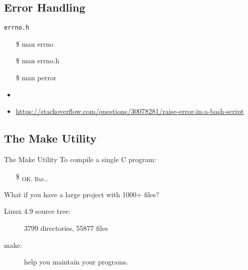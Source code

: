 \subsection{Error Handling}
\label{sec:error-handling}

\begin{frame}{\texttt{errno.h}}
  \begin{center}
  \end{center}\ttfamily
  \begin{itemize}
  \item[\$] man errno
  \item[\$] man errno.h
  \item[\$] man perror
  \end{itemize}
\end{frame}

\begin{itemize}
\item {}
\item \url{https://stackoverflow.com/questions/30078281/raise-error-in-a-bash-script}
\end{itemize}

\subsection{The Make Utility}

\begin{frame}{The Make Utility}
  To compile a single C program:
  \begin{itemize}
  \item[\$] \quad{\Huge \correct}\textsubscript{{\tiny OK. But\ldots}}
  \end{itemize}
  \begin{iblock}{What if you have a large project with 1000+ files?}
    \begin{center}
    \end{center}
    \begin{description}
    \item[Linux 4.9 source tree:] 3799 directories, 55877 files
    \end{description}
  \end{iblock}
  \begin{description}
  \item[make:] help you maintain your programs.
  \end{description}
\end{frame}

